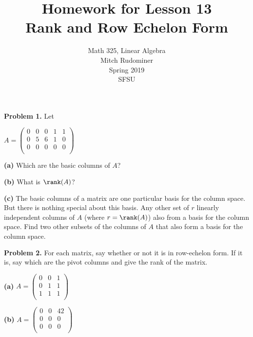 \documentclass[oneside,12pt]{amsart}
\begin{document}
\title{Homework for Lesson 13 \\ Rank and Row Echelon Form}
\author{Math 325, Linear Algebra \\ Mitch Rudominer \\ Spring 2019 \\ SFSU }
\date{}

\maketitle

\bigskip

\textbf{Problem 1.} Let

$
A =
\begin{pmatrix}
0 & 0 & 0  & 1  & 1\\
0 & 5 & 6  & 1  & 0\\
0 & 0 & 0  & 0  & 0\\
\end{pmatrix}
$

\medskip

\textbf{(a)} Which are the basic columns of $A$?

\bigskip
\bigskip
\bigskip
\bigskip
\bigskip
\bigskip

\textbf{(b)} What is $\rank(A)$?

\bigskip
\bigskip
\bigskip
\bigskip
\bigskip
\bigskip

\textbf{(c)} The basic columns of a matrix are one particular basis for
the column space. But there is nothing special about this basis.  Any other
set of $r$ linearly independent columns of $A$ (where $r=\rank(A)$) also from
a basis for the column space. Find
two other subsets of the columns of $A$ that also form a basis for the column
space.

\bigskip
\bigskip
\bigskip
\bigskip
\bigskip
\bigskip

\newpage

\textbf{Problem 2.} For each matrix, say whether or not it is in row-echelon
form. If it is, say which are the pivot columns and give the rank of the matrix.


\textbf{(a)}
$
A =
\begin{pmatrix}
0 & 0 & 1\\
0 & 1 & 1\\
1 & 1 & 1\\
\end{pmatrix}
$

\bigskip
\bigskip
\bigskip
\bigskip
\bigskip
\bigskip

\textbf{(b)}
$
A =
\begin{pmatrix}
0 & 0 & 42\\
0 & 0 & 0\\
0 & 0 & 0\\
\end{pmatrix}
$
\end{document}
